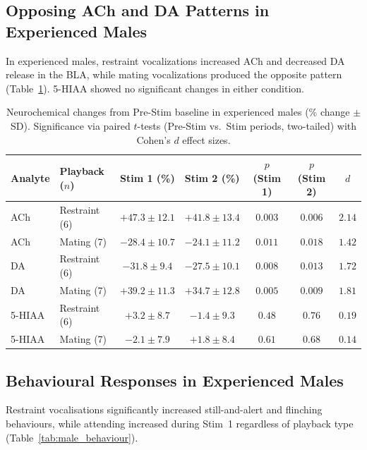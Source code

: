 \documentclass[11pt]{article}
\begin{document}
\subsection{Opposing ACh and DA Patterns in Experienced Males}

In experienced males, restraint vocalizations increased ACh and decreased DA release in the BLA, while mating vocalizations produced the opposite pattern (Table~\ref{tab:male_neurochemistry}). 5-HIAA showed no significant changes in either condition.

\begin{table}[H]
\centering
\caption{Neurochemical changes from Pre-Stim baseline in experienced males (\% change $\pm$ SD). Significance via paired $t$-tests (Pre-Stim vs.\ Stim periods, two-tailed) with Cohen's $d$ effect sizes.}
\label{tab:male_neurochemistry}
\begin{tabular}{llccccc}
\toprule
Analyte & Playback ($n$) & Stim 1 (\%) & Stim 2 (\%) & $p$ (Stim 1) & $p$ (Stim 2) & $d$ \\
\midrule
ACh & Restraint (6) & $+47.3 \pm 12.1$ & $+41.8 \pm 13.4$ & $0.003$ & $0.006$ & $2.14$ \\
ACh & Mating (7) & $-28.4 \pm 10.7$ & $-24.1 \pm 11.2$ & $0.011$ & $0.018$ & $1.42$ \\
DA & Restraint (6) & $-31.8 \pm 9.4$ & $-27.5 \pm 10.1$ & $0.008$ & $0.013$ & $1.72$ \\
DA & Mating (7) & $+39.2 \pm 11.3$ & $+34.7 \pm 12.8$ & $0.005$ & $0.009$ & $1.81$ \\
5-HIAA & Restraint (6) & $+3.2 \pm 8.7$ & $-1.4 \pm 9.3$ & $0.48$ & $0.76$ & $0.19$ \\
5-HIAA & Mating (7) & $-2.1 \pm 7.9$ & $+1.8 \pm 8.4$ & $0.61$ & $0.68$ & $0.14$ \\
\bottomrule
\end{tabular}
\end{table}

\subsection{Behavioural Responses in Experienced Males}

Restraint vocalisations significantly increased still-and-alert and flinching behaviours, while attending increased during Stim~1 regardless of playback type (Table~\ref{tab:male_behaviour}).
\end{document}
